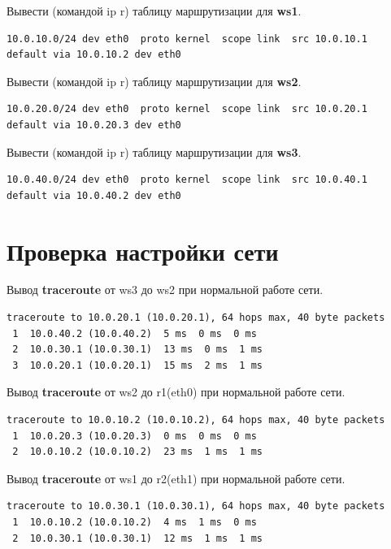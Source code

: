 \documentclass[a4paper,12pt]{article}
\begin{document}
Вывести (командой ip r) таблицу маршрутизации для \textbf{ws1}.

\begin{Verbatim}
10.0.10.0/24 dev eth0  proto kernel  scope link  src 10.0.10.1 
default via 10.0.10.2 dev eth0 
\end{Verbatim}

Вывести (командой ip r) таблицу маршрутизации для \textbf{ws2}.

\begin{Verbatim}
10.0.20.0/24 dev eth0  proto kernel  scope link  src 10.0.20.1 
default via 10.0.20.3 dev eth0 
\end{Verbatim}

Вывести (командой ip r) таблицу маршрутизации для \textbf{ws3}.

\begin{Verbatim}
10.0.40.0/24 dev eth0  proto kernel  scope link  src 10.0.40.1 
default via 10.0.40.2 dev eth0
\end{Verbatim}


\section{Проверка настройки сети}

Вывод \textbf{traceroute} от ws3 до ws2 при нормальной работе сети.

\begin{Verbatim}
traceroute to 10.0.20.1 (10.0.20.1), 64 hops max, 40 byte packets
 1  10.0.40.2 (10.0.40.2)  5 ms  0 ms  0 ms
 2  10.0.30.1 (10.0.30.1)  13 ms  0 ms  1 ms
 3  10.0.20.1 (10.0.20.1)  15 ms  2 ms  1 ms
\end{Verbatim}

Вывод \textbf{traceroute} от ws2 до r1(eth0) при нормальной работе сети.

\begin{Verbatim}
traceroute to 10.0.10.2 (10.0.10.2), 64 hops max, 40 byte packets
 1  10.0.20.3 (10.0.20.3)  0 ms  0 ms  0 ms
 2  10.0.10.2 (10.0.10.2)  23 ms  1 ms  1 ms
\end{Verbatim}

Вывод \textbf{traceroute} от ws1 до r2(eth1) при нормальной работе сети.

\begin{Verbatim}
traceroute to 10.0.30.1 (10.0.30.1), 64 hops max, 40 byte packets
 1  10.0.10.2 (10.0.10.2)  4 ms  1 ms  0 ms
 2  10.0.30.1 (10.0.30.1)  12 ms  1 ms  1 ms
\end{Verbatim}
\end{document}
